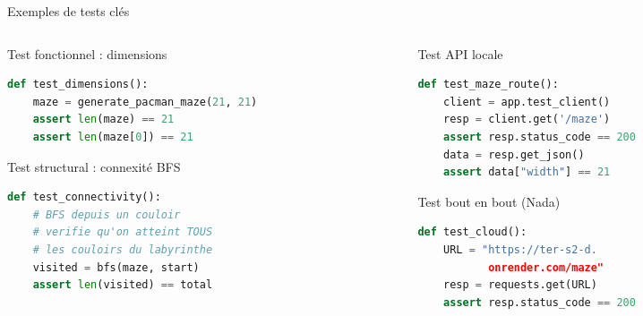 \documentclass[aspectratio=169, 12pt]{beamer}
\begin{document}
\begin{frame}[fragile]{Exemples de tests clés}

\begin{columns}[T]
\begin{column}{0.48\textwidth}
\begin{block}{\scriptsize Test fonctionnel : dimensions}
\begin{lstlisting}[language=Python]
def test_dimensions():
    maze = generate_pacman_maze(21, 21)
    assert len(maze) == 21
    assert len(maze[0]) == 21
\end{lstlisting}
\end{block}

\begin{block}{\scriptsize Test structural : connexité BFS}
\begin{lstlisting}[language=Python]
def test_connectivity():
    # BFS depuis un couloir
    # verifie qu'on atteint TOUS
    # les couloirs du labyrinthe
    visited = bfs(maze, start)
    assert len(visited) == total
\end{lstlisting}
\end{block}
\end{column}

\begin{column}{0.48\textwidth}
\begin{block}{\scriptsize Test API locale}
\begin{lstlisting}[language=Python]
def test_maze_route():
    client = app.test_client()
    resp = client.get('/maze')
    assert resp.status_code == 200
    data = resp.get_json()
    assert data["width"] == 21
\end{lstlisting}
\end{block}

\begin{block}{\scriptsize Test bout en bout (Nada)}
\begin{lstlisting}[language=Python]
def test_cloud():
    URL = "https://ter-s2-d.
           onrender.com/maze"
    resp = requests.get(URL)
    assert resp.status_code == 200
\end{lstlisting}
\end{block}
\end{column}
\end{columns}

\end{frame}

\end{document}
